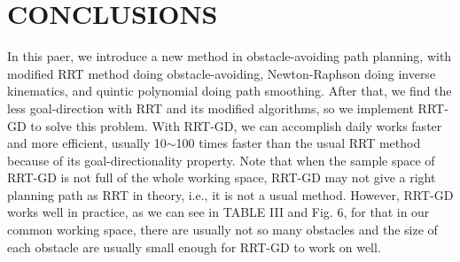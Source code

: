 \documentclass[letterpaper, 10 pt, conference]{ieeeconf}  %
\begin{document}
\section{CONCLUSIONS}

In this paer, we introduce a new method in obstacle-avoiding path planning, with modified RRT method doing obstacle-avoiding, Newton-Raphson doing inverse kinematics, and quintic polynomial doing path smoothing. After that, we find the less goal-direction with RRT and its modified algorithms, so we implement RRT-GD to solve this problem. With RRT-GD, we can accomplish daily works faster and more efficient, usually 10$\sim$100 times faster than the usual RRT method because of its goal-directionality property. Note that when the sample space of RRT-GD is not full of the whole working space, RRT-GD may not give a right planning path as RRT in theory, i.e., it is not a usual method. However, RRT-GD works well in practice, as we can see in TABLE III and Fig. 6, for that in our common working space, there are usually not so many obstacles and the size of each obstacle are usually small enough for RRT-GD to work on well.

\addtolength{\textheight}{-12cm}   %










\end{document}
